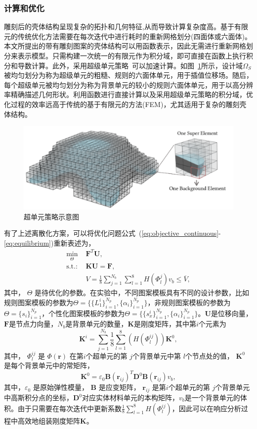 \subsubsection{计算和优化}
雕刻后的壳体结构呈现复杂的拓扑和几何特征,从而导致计算复杂度高。基于有限元的传统优化方法需要在每次迭代中进行耗时的重新网格划分(四面体或六面体)。本文所提出的带有雕刻图案的壳体结构可以用函数表示，因此无需进行重新网格划分来表示模型。只需构建一次统一的有限元作为积分域，即可直接在函数上执行积分和导数计算。此外，采用超级单元策略~\cite{Nguyen2010,Liu2018MMC}可以加速计算。如图~\ref{fig-superelement}所示，设计域$\Omega_S$被均匀划分为称为超级单元的粗糙、规则的六面体单元，用于插值位移场。随后，每个超级单元被均匀划分为称为背景单元的较小的规则六面体单元，用于以高分辨率精确描述几何形状。利用函数进行直接计算以及采用超级单元策略的积分域，优化过程的效率远高于传统的基于有限元的方法(FEM)，尤其适用于复杂的雕刻壳体结构。
\begin{figure}
    \centering
    \includegraphics[width=0.6\linewidth]{./figures/super-ele}
    \caption{超单元策略示意图}
    \label{fig-superelement}
\end{figure}

有了上述离散化方案，可以将优化问题公式~(\ref{eq:objective_continuous}-\ref{eq:equilibrium})重新表述为，
\begin{align}
	\label{eq:d_formulation}
  \min_{\Theta}\,\, &\textbf{F}^T\textbf{U},\\
  \text{s.t.:}\,\,& \textbf{KU}=\textbf{F},\\
	&V=\frac{1}{8}\sum_{j=1}^{N_b}\sum_{l=1}^8H(\Phi_l^j)v_b \leq\overline{V},
\end{align}
其中， $\Theta$ 是待优化的参数。在实验中，不同图案模板具有不同的设计参数，比如规则图案模板的参数为$\Theta=\{\{L_1^i\}_{i=1}^{N_p}, \{\alpha_i\}_{i=1}^{N_p}\}$，非规则图案模板的参数为$\Theta=\{s_i\}_{i=1}^{N_p}$，个性化图案模板的参数为$\Theta=\{\{s_x^i\}_{i=1}^{N_p}, \{\alpha_i\}_{i=1}^{N_p}\}$。$\textbf{U}$是位移向量，$\textbf{F}$是节点力向量，$N_b$是背景单元的数量，$\textbf{K}$是刚度矩阵，其中第$i$个元素为
\begin{equation}
	\textbf{K}^i=\sum_{j=1}^{N_b}\frac{1}{8}\sum_{l=1}^8(H(\Phi_l^{ij}))\textbf{K}^0,
\end{equation}
其中， $\Phi_l^{ij}$ 是 $\Phi(\textbf{r})$ 在第$i$个超单元的第 $j$个背景单元中第 $l$个节点处的值， $\textbf{K}^0$ 是每个背景单元中的常矩阵，
\begin{equation}
	\textbf{K}^0=\varepsilon_0\textbf{B}(\textbf{r}_{ij})^T \textbf{D}^0 \textbf{B}(\textbf{r}_{ij})v_b,
\end{equation}
其中，$\varepsilon_0$ 是原始弹性模量， $\textbf{B}$ 是应变矩阵， $\textbf{r}_{ij}$ 是第$i$个超单元的第 $j$个背景单元中高斯积分点的坐标，$\textbf{D}^0$对应实体材料单元的本构矩阵，$v_b$是一个背景单元的体积。由于只需要在每次迭代中更新系数$\frac{1}{8}\sum_{l=1}^8H(\Phi^{ij}_l)$，因此可以在响应分析过程中高效地组装刚度矩阵$\textbf{K}$。

